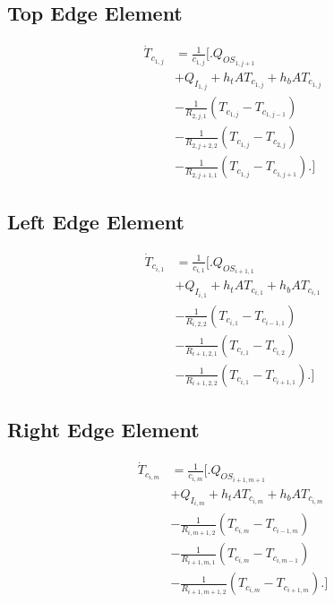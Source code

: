 \documentclass[10pt,twocolumn]{article}
\begin{document}
\subsection{Top Edge Element}
\begin{equation}
\begin{split}
\dot{T}_{c_{1,j}}	& = \frac{1}{c_{1,j}}
					\Biggl[\Biggr.
					 	   Q_{OS_{1,j+1}} \\
					&	 + Q_{I_{1,j}}+ h_{t}AT_{c_{1,j}} + h_{b}AT_{c_{1,j}} \\
					&	- \frac{1}{R_{2,j,1}}\left(T_{c_{1,j}}- T_{c_{1,j-1}}\right) \\
					& 	- \frac{1}{R_{2,j+2,2}}\left(T_{c_{1,j}}- T_{c_{2,j}}\right) \\
					& 	- \frac{1}{R_{2,j+1,1}}\left(T_{c_{1,j}}- T_{c_{1,j+1}}\right)
					\Biggl.\Biggr]
\end{split}
\end{equation}

\subsection{Left Edge Element}
\begin{equation}
\begin{split}
\dot{T}_{c_{i,1}}	& = \frac{1}{c_{i,1}}
					\Biggl[\Biggr.
					 	  Q_{OS_{i+1,1}} \\
					&	+ Q_{I_{i,1}}+ h_{t}AT_{c_{i,1}} + h_{b}AT_{c_{i,1}} \\
					&	- \frac{1}{R_{i,2,2}}\left(T_{c_{i,1}}- T_{c_{i-1,1}}\right) \\
					& 	- \frac{1}{R_{i+1,2,1}}\left(T_{c_{i,1}}- T_{c_{i,2}}\right) \\
					& 	- \frac{1}{R_{i+1,2,2}}\left(T_{c_{i,1}}- T_{c_{i+1,1}}\right)
					\Biggl.\Biggr]
\end{split}
\end{equation}

\subsection{Right Edge Element}
\begin{equation}
\begin{split}
\dot{T}_{c_{i,m}}	& = \frac{1}{c_{i,m}}
					\Biggl[\Biggr.
					 	  Q_{OS_{i+1,m+1}} \\
					&	+ Q_{I_{i,m}}+ h_{t}AT_{c_{i,m}} + h_{b}AT_{c_{i,m}} \\					
					&	- \frac{1}{R_{i,m+1,2}}\left(T_{c_{i,m}}- T_{c_{i-1,m}}\right) \\
					& 	- \frac{1}{R_{i+1,m,1}}\left(T_{c_{i,m}}- T_{c_{i,m-1}}\right) \\
					& 	- \frac{1}{R_{i+1,m+1,2}}\left(T_{c_{i,m}}- T_{c_{i+1,m}}\right)
					\Biggl.\Biggr]
\end{split}
\end{equation}
\end{document}
